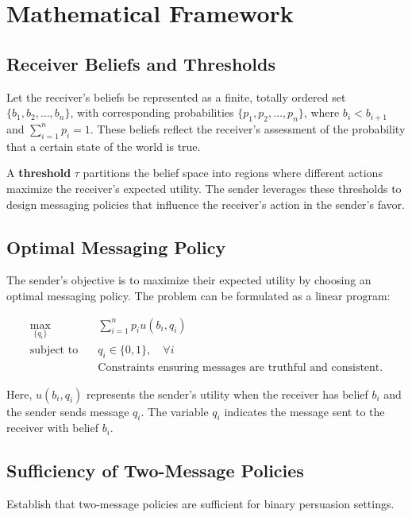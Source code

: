 \documentclass[12pt]{article}
\begin{document}
\section{Mathematical Framework}

\subsection{Receiver Beliefs and Thresholds}

Let the receiver's beliefs be represented as a finite, totally ordered set \( \{b_1, b_2, \dots, b_n\} \), with corresponding probabilities \( \{p_1, p_2, \dots, p_n\} \), where \( b_i < b_{i+1} \) and \( \sum_{i=1}^n p_i = 1 \). These beliefs reflect the receiver's assessment of the probability that a certain state of the world is true.

A \textbf{threshold} \( \tau \) partitions the belief space into regions where different actions maximize the receiver's expected utility. The sender leverages these thresholds to design messaging policies that influence the receiver's action in the sender's favor.

\subsection{Optimal Messaging Policy}

The sender's objective is to maximize their expected utility by choosing an optimal messaging policy. The problem can be formulated as a linear program:

\begin{align}
\max_{\{q_i\}} \quad & \sum_{i=1}^n p_i u(b_i, q_i) \label{eq:lp_objective} \\
\text{subject to} \quad & q_i \in \{0,1\}, \quad \forall i \label{eq:lp_integrality} \\
& \text{Constraints ensuring messages are truthful and consistent.} \nonumber
\end{align}

Here, \( u(b_i, q_i) \) represents the sender's utility when the receiver has belief \( b_i \) and the sender sends message \( q_i \). The variable \( q_i \) indicates the message sent to the receiver with belief \( b_i \).

\subsection{Sufficiency of Two-Message Policies}

Establish that two-message policies are sufficient for binary persuasion settings.
\end{document}
